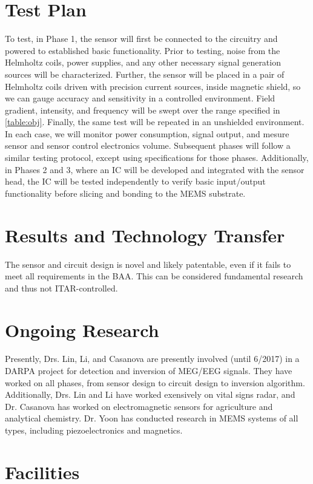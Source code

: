 \section{Test Plan}

To test, in Phase 1, the sensor will first be connected to the circuitry and powered to established basic functionality.  Prior to testing, noise from the Helmholtz coils, power supplies, and any other necessary signal generation sources will be characterized. Further, the sensor will be placed in a pair of Helmholtz coils driven with precision current sources, inside magnetic shield, so we can gauge accuracy and sensitivity in a controlled environment. Field gradient, intensity, and frequency will be swept over the range specified in \ref{table:obj}. Finally, the same test will be repeated in an unshielded environment. In each case, we will monitor power consumption, signal output, and mesure sensor and sensor control electronics volume. Subsequent phases will follow a similar testing protocol, except using specifications for those phases. Additionally, in Phases 2 and 3, where an IC will be developed and integrated with the sensor head, the IC will be tested independently to verify basic input/output functionality before slicing and bonding to the MEMS substrate.

\section{Results and Technology Transfer}

The sensor and circuit design is novel and likely patentable, even if it fails to meet all requirements in the BAA. This can be considered fundamental research and thus not ITAR-controlled.

\section{Ongoing Research}
Presently, Drs. Lin, Li, and Casanova are presently involved (until 6/2017) in a DARPA project for detection and inversion of MEG/EEG signals. They have worked on all phases, from sensor design to circuit design to inversion algorithm. Additionally, Drs. Lin and Li have worked exensively on vital signs radar, and Dr. Casanova has worked on electromagnetic sensors for agriculture and analytical chemistry. Dr. Yoon has conducted research in MEMS systems of all types, including piezoelectronics and magnetics. 

\section{Facilities}

